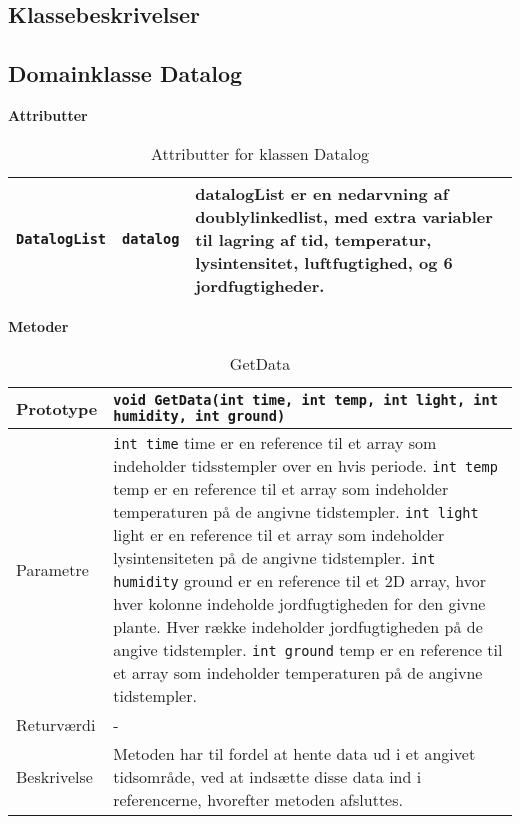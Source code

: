 \clearpage

\subsection{Klassebeskrivelser}

\subsection{Domainklasse Datalog}

\textbf{Attributter}

\begin{table}[h]
\begin{tabularx}{\textwidth}{| >{\raggedright\arraybackslash}X | >{\raggedright\arraybackslash}X | >{\raggedright\arraybackslash}p{10 cm} |} \hline
\texttt{DatalogList} & \texttt{datalog} & datalogList er en nedarvning af doublylinkedlist, med extra variabler til lagring af tid, temperatur, lysintensitet, luftfugtighed, og 6 jordfugtigheder. \\\hline
\end{tabularx}
\caption{Attributter for klassen Datalog}
\label{table:Datalog_attributter}
\end{table}

\textbf{Metoder}

\begin{table}[h]
\begin{tabularx}{\textwidth}{| >{\raggedright\arraybackslash}p{2.5 cm} | >{\raggedright\arraybackslash}X |} \hline
Prototype & \texttt{void GetData(int time, int temp, int light, int humidity, int ground)} \\\hline
Parametre & \texttt{int time} \newline 
time er en reference til et array som indeholder tidsstempler over en hvis periode. \newline
\texttt{int temp} \newline
temp er en reference til et array som indeholder temperaturen på de angivne tidstempler. \newline
\texttt{int light} \newline
light er en reference til et array som indeholder lysintensiteten på de angivne tidstempler. \newline
\texttt{int humidity} \newline
ground er en reference til et 2D array, hvor hver kolonne indeholde jordfugtigheden for den givne plante. Hver række indeholder jordfugtigheden på de angive tidstempler. \newline
\texttt{int ground} \newline
temp er en reference til et array som indeholder temperaturen på de angivne tidstempler. \\\hline
Returværdi & - \\\hline
Beskrivelse & Metoden har til fordel at hente data ud i et angivet tidsområde, ved at indsætte disse data ind i referencerne, hvorefter metoden afsluttes. \\\hline
\end{tabularx}
\caption{GetData}
\label{table:GetData}
\end{table}

